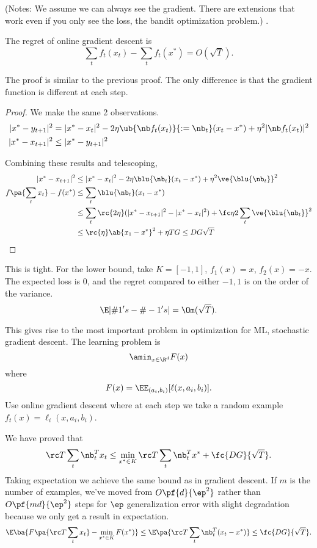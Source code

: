 (Notes: We assume we can always see the gradient. There are extensions that work even if you only see the loss, the bandit optimization problem.)
.
\begin{thm}[Zinkevich]
The regret of online gradient descent is
$$
\sum_tf_t(x_t) - \sum_t f_t(x^*) =O(\sqrt T).
$$
\end{thm}
The proof is similar to the previous proof.
The only difference is that the gradient function is different at each step.
\begin{proof}
We make the same 2 observations.
\begin{align}
|x^*-y_{t+1}|^2 &=|x^*-x_t|^2 - 2\eta \ub{\nb f_t(x_t)}{:=\nb_t} (x_t-x^*) + \eta^2|\nb f_t(x_t)|^2\\
|x^*-x_{t+1}|^2&\le |x^* -y_{t+1}|^2
\end{align}

Combining these results and telescoping,
\begin{align}
|x^*-x_{t+1}|^2 &\le |x^*-x_t|^2 - 2\eta \blu{\nb_t} (x_t-x^*)  +\eta^2 \ve{\blu{\nb_t}}^2\\
f\pa{\sum_t x_t} - f(x^*)
&\le %
\sum_t \blu{\nb_t} (x_t-x^*)\\
&\le %
\sum_t \rc{2\eta} (|x^*-x_{t+1}|^2-|x^*-x_t|^2)+\fc\eta 2 \sum_t \ve{\blu{\nb_t}}^2\\
&\le \rc{\eta} \ab{x_1-x^*}^2 + \eta TG
\le DG\sqrt T%
\end{align}
\end{proof}
This is tight. For the lower bound, take $K=[-1,1]$, $f_1(x)=x$, $f_2(x)=-x$. The expected loss is 0, and the regret compared to either $-1,1$ is on the order of the variance.
$$
\E|\#1's - \#-1's|=\Om(\sqrt T).
$$

This gives rise to the most important problem in optimization for ML, stochastic gradient descent.
The learning problem is 
$$\amin_{x\in \R^d}F(x)$$ where 
$$F(x) = \EE_{(a_i,b_i)}[\ell(x,a_i,b_i)].$$
Use online gradient descent where at each step we take a random example $f_t(x) = \ell_i(x,a_i,b_i)$.

We have proved that 
$$
\rc T\sum_t \nb_t^T x_t \le \min_{x^*\in K}\rc T \sum_t \nb_t^T x^* + \fc{DG}{\sqrt T}.
$$
Taking expectation we achieve the same bound as in gradient descent. If $m$ is the number of examples, we've moved from $O\pf{d}{\ep^2}$ rather than $O\pf{md}{\ep^2}$ steps for $\ep$ generalization error with slight degradation because we only get a result in expectation.
$$
\E\ba{
F\pa{\rc T\sum_t x_t} - \min_{x^*\in K} F(x^*)
} \le \E\pa{\rc T \sum_t \nb_t^T (x_t-x^*)}\le \fc{DG}{\sqrt T}.
$$

